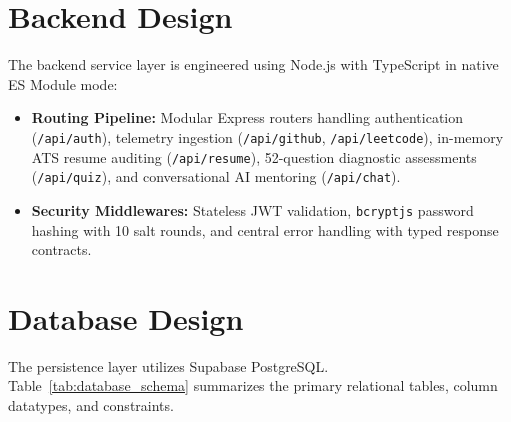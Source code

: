 \section{Backend Design}
The backend service layer is engineered using Node.js with TypeScript in native ES Module mode:
\begin{itemize}
    \item \textbf{Routing Pipeline:} Modular Express routers handling authentication (\texttt{/api/auth}), telemetry ingestion (\texttt{/api/github}, \texttt{/api/leetcode}), in-memory ATS resume auditing (\texttt{/api/resume}), 52-question diagnostic assessments (\texttt{/api/quiz}), and conversational AI mentoring (\texttt{/api/chat}).
    \item \textbf{Security Middlewares:} Stateless JWT validation, \texttt{bcryptjs} password hashing with 10 salt rounds, and central error handling with typed response contracts.
\end{itemize}

\section{Database Design}
The persistence layer utilizes Supabase PostgreSQL. Table~\ref{tab:database_schema} summarizes the primary relational tables, column datatypes, and constraints.

